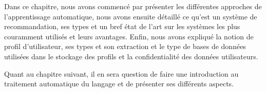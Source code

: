 Dans ce chapitre, nous avons commencé par présenter les différentes approches de l'apprentissage automatique, nous avons ensuite détaillé ce qu'est un système de recommandation, ses types et un bref état de l'art sur les systèmes les plus couramment utilisés et leurs avantages. Enfin, nous avons expliqué la notion de profil d'utilisateur, ses types et son extraction et le type de bases de données utilisées dans le stockage des profils et la confidentialité des données utilisateurs.

Quant au chapitre suivant, il en sera question de faire une introduction au traitement automatique du langage et de présenter ses différents aspects.